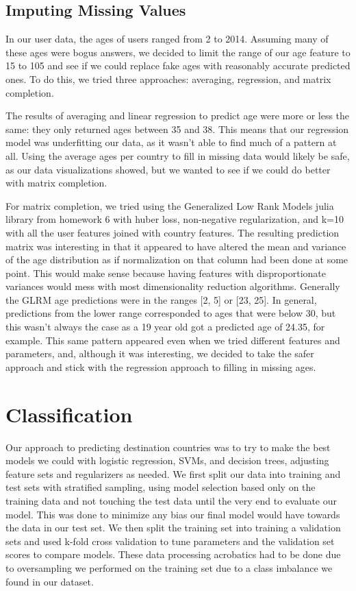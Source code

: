 \documentclass[a4paper, 11pt]{article}
\begin{document}
\subsection*{Imputing Missing Values}
\par
    In our user data, the ages of users ranged from 2 to 2014. Assuming many of these ages were bogus answers, we decided to limit the range of our age feature to 15 to 105 and see if we could replace fake ages with reasonably accurate predicted ones. To do this, we tried three approaches: averaging, regression, and matrix completion.
    \par
The results of averaging and linear regression to predict age were more or less the same: they only returned ages between 35 and 38. This means that our regression model was underfitting our data, as it wasn’t able to find much of a pattern at all. Using the average ages per country to fill in missing data would likely be safe, as our data visualizations showed, but we wanted to see if we could do better with matrix completion.
\par
For matrix completion, we tried using the Generalized Low Rank Models julia library from homework 6 with huber loss, non-negative regularization, and  k=10 with all the user features joined with country features. The resulting prediction matrix was interesting in that it appeared to have altered the mean and variance of the age distribution as if normalization on that column had been done at some point. This would make sense because having features with disproportionate variances would mess with most dimensionality reduction algorithms. Generally the GLRM age predictions were in the ranges [2, 5] or [23, 25]. In general, predictions from the lower range corresponded to ages that were below 30, but this wasn’t always the case as a 19 year old got a predicted age of 24.35, for example. This same pattern appeared even when we tried different features and parameters, and, although it was interesting, we decided to take the safer approach and stick with the regression approach to filling in missing ages.

\section*{Classification}
\par
Our approach to predicting destination countries was to try to make the best models we could with logistic regression, SVMs, and decision trees, adjusting feature sets and regularizers as needed. We first split our data into training and test sets with stratified sampling, using model selection based only on the training data and not touching the test data until the very end to evaluate our model. This was done to minimize any bias our final model would have towards the data in our test set. We then split the training set into training a validation sets and used k-fold cross validation to tune parameters and the validation set scores to compare models. These data processing acrobatics had to be done due to oversampling we performed on the training set due to a class imbalance we found in our dataset.
\end{document}
